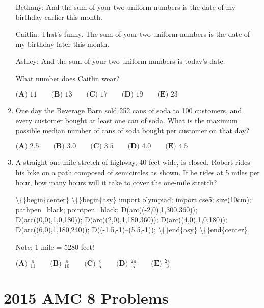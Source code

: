 \documentclass{article}
\begin{document}
\begin{enumerate}[label=\arabic*., itemsep=0.5em]
Bethany: And the sum of your two uniform numbers is the date of my birthday earlier this month.

Caitlin: That's funny. The sum of your two uniform numbers is the date of my birthday later this month.

Ashley: And the sum of your two uniform numbers is today's date.

What number does Caitlin wear?

\( \textbf{(A) }11\qquad\textbf{(B) }13\qquad\textbf{(C) }17\qquad\textbf{(D) }19\qquad\textbf{(E) }23 \)\par \vspace{0.5em}\item One day the Beverage Barn sold 252 cans of soda to 100 customers, and every customer bought at least one can of soda. What is the maximum possible median number of cans of soda bought per customer on that day?

\(\textbf{(A) }2.5\qquad\textbf{(B) }3.0\qquad\textbf{(C) }3.5\qquad\textbf{(D) }4.0\qquad\textbf{(E) }4.5 \)\par \vspace{0.5em}\item A straight one-mile stretch of highway, 40 feet wide, is closed. Robert rides his bike on a path composed of semicircles as shown. If he rides at 5 miles per hour, how many hours will it take to cover the one-mile stretch?


\textbackslash\{\}begin\{center\}
\textbackslash\{\}begin\{asy\}
import olympiad;
import cse5;
size(10cm); pathpen=black; pointpen=black;
D(arc((-2,0),1,300,360));
D(arc((0,0),1,0,180));
D(arc((2,0),1,180,360));
D(arc((4,0),1,0,180));
D(arc((6,0),1,180,240));
D((-1.5,-1)--(5.5,-1));
\textbackslash\{\}end\{asy\}
\textbackslash\{\}end\{center\}

Note: 1 mile = 5280 feet!

\( \textbf{(A) }\frac{\pi}{11}\qquad\textbf{(B) }\frac{\pi}{10}\qquad\textbf{(C) }\frac{\pi}{5}\qquad\textbf{(D) }\frac{2\pi}{5}\qquad\textbf{(E) }\frac{2\pi}{3} \)\par \vspace{0.5em}\end{enumerate}\newpage\section*{2015 AMC 8 Problems}
\end{document}
